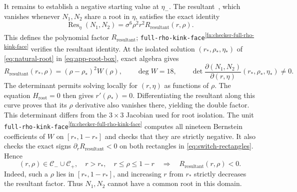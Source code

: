 \documentclass[11pt]{article}
\theoremstyle{remark}
\theoremstyle{plain}
\begin{document}
It remains to establish a negative starting value at $\eta_-$.
The resultant~\cite{cox2015}, which vanishes whenever $N_1,N_2$ share a root in
$\eta$, satisfies the exact identity
\begin{equation}
 \operatorname{Res}_{\eta}(N_1,N_2)
       =\sigma^6\rho^2r^2R_{\mathrm{resultant}}(r,\rho).
 \label{eq:switch-resultant}
\end{equation}
This defines the polynomial factor $R_{\mathrm{resultant}}$;
\nolinkurl{full-rho-kink-face}\textsuperscript{\ref{fn:checker-full-rho-kink-face}} verifies the resultant identity.
At the isolated solution $(r_*,\rho_*,\eta_*)$ of
\eqref{eq:natural-root} in \eqref{eq:app-root-box}, exact algebra gives
\begin{equation}
 R_{\mathrm{resultant}}(r_*,\rho)=(\rho-\rho_*)^2W(\rho),\qquad \deg W=18,
 \qquad
 \det\frac{\partial(N_1,N_2)}{\partial(r,\eta)}
          (r_*,\rho_*,\eta_*)\ne0.
 \label{eq:switch-resultant-at-root}
\end{equation}
The determinant permits solving locally for $(r,\eta)$ as functions
of $\rho$. The equation $H_{\mathrm{root}}=0$ then gives $r'(\rho_*)=0$.
Differentiating the resultant along this curve proves that its
$\rho$ derivative also vanishes there, yielding the double factor.
This determinant differs from the $3\times3$ Jacobian used for
root isolation.
The unit \nolinkurl{full-rho-kink-face}\textsuperscript{\ref{fn:checker-full-rho-kink-face}} computes all nineteen
Bernstein coefficients of $W$ on $[r_*,1-r_*]$ and checks that
they are strictly negative. It also checks the exact signs
$\partial_r R_{\mathrm{resultant}}<0$ on both rectangles in
\eqref{eq:switch-rectangles}. Hence
\begin{equation}
 (r,\rho)\in\mathcal C_-\cup\mathcal C_+,\quad
 r>r_*,\quad r\le\rho\le1-r
 \quad\Longrightarrow\quad R_{\mathrm{resultant}}(r,\rho)<0.
 \label{eq:switch-resultant-negative}
\end{equation}
Indeed, such a $\rho$ lies in $[r_*,1-r_*]$, and increasing $r$
from $r_*$ strictly decreases the resultant factor.
Thus $N_1,N_2$ cannot have a common root in this domain.
\end{document}

